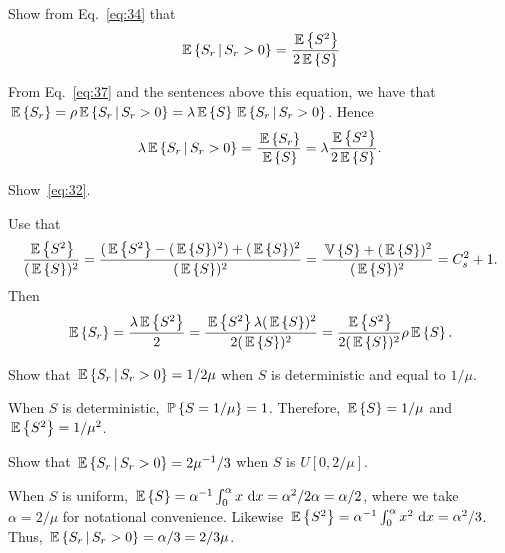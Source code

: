 \begin{question}\label{ex:9}
Show  from Eq.~\eqref{eq:34} that
\begin{equation*}
  \E{S_r\given S_r>0} = \frac{\E{S^2}}{2 \E S}
\end{equation*}
\begin{solution}
 From Eq.~\eqref{eq:37} and the sentences above this equation,
    we have that
    $\E{S_r} = \rho \E{S_r\given S_r>0}=\lambda \E S \E{S_r\given S_r>0}$. Hence
    \begin{equation*}
    \lambda \E{S_r\given S_r>0} = \frac{\E{S_r}}{\E S} = \lambda \frac{\E{S^2}}{2 \E S}.
    \end{equation*}
\end{solution}
\end{question}


\begin{question}
Show~\eqref{eq:32}. 
\begin{solution}
Use that 
\begin{equation*}
  \frac{\E{S^2}}{(\E S)^2} = 
  \frac{(\E{S^2}-(\E S)^2) + (\E S)^2}{(\E S)^2} =
  \frac{\V S + (\E S)^2}{(\E S)^2} =
  C_s^2 + 1.
\end{equation*}
Then
\begin{equation*}
  \E{S_r}=\frac{\lambda\E{S^2}}2 = \frac{\E{S^2}\lambda(\E S)^2}{2(\E S)^2}=
 \frac{\E{S^2}}{2(\E S)^2} \rho \E S.
\end{equation*}
\end{solution}
\end{question}

\begin{question}
Show that  $\E {S_r\given S_r>0} = 1/2\mu$
  when $S$ is deterministic and equal to $1/\mu$.
\begin{solution}
 When $S$ is deterministic, $\P{S=1/\mu} = 1$. Therefore, $\E S=1/\mu$ and $\E{S^2} = 1/\mu^2$. 
\end{solution}
\end{question}

\begin{question}
Show that $\E{S_r\given S_r>0} = 2\mu^{-1}/3$ when  $S$ is $U[0,2/\mu]$.
\begin{solution}
 When $S$ is uniform,
    $\E S = \alpha^{-1}\int_0^\alpha x \, \d x =\alpha^2/2 \alpha =
    \alpha/2$,
    where we take $\alpha =2/\mu$ for notational convenience. Likewise $\E{S^2} = \alpha^{-1}\int_0^\alpha x^2 \, \d x = \alpha^2/3$. Thus, $\E{S_r\given S_r>0} = \alpha/3 = 2/3\mu$.
\end{solution}
\end{question}

